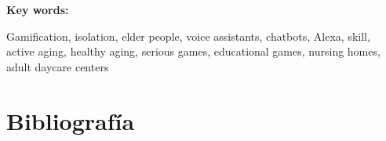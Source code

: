 \documentclass[12pt]{article}
\begin{document}
\vline

\textbf{Key words:}

Gamification, isolation, elder people, voice assistants, chatbots, Alexa, skill, active aging, healthy aging, serious games, educational games, nursing homes, adult daycare centers

\newpage
\tableofcontents

\newpage
\listoffigures

\newpage
\listoftables

\newpage



\newpage


\newpage


\newpage


\newpage


\newpage


\newpage


\newpage


\newpage


\newpage
\section{Bibliografía}
\renewcommand{\bibitemsep}{1em}
\printbibliography[heading=empty]
\end{document}
